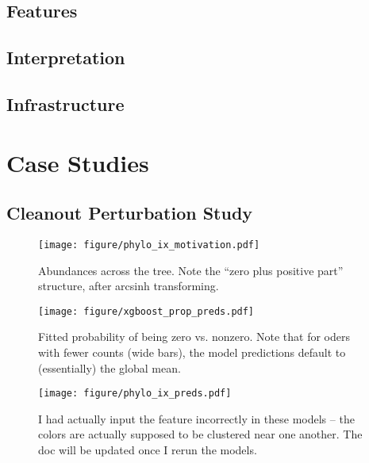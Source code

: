 \documentclass{article}
\begin{document}
\subsection{Features}

\subsection{Interpretation}

\subsection{Infrastructure}

\section{Case Studies}

\subsection{Cleanout Perturbation Study}

\begin{figure}[ht]
  \centering
  \texttt{[image: figure/phylo\_ix\_motivation.pdf]}
  \caption{Abundances across the tree. Note the ``zero plus positive part'' structure, after arcsinh transforming. \label{fig:label} }
\end{figure}


\begin{figure}[ht]
  \centering
  \texttt{[image: figure/xgboost\_prop\_preds.pdf]}
  \caption{Fitted probability of being zero vs. nonzero. Note that for oders with fewer counts (wide bars), the model predictions default to (essentially) the global mean.\label{fig:label} }
\end{figure}

\begin{figure}[ht]
  \centering
  \texttt{[image: figure/phylo\_ix\_preds.pdf]}
  \caption{I had actually input the feature incorrectly in these models -- the colors are actually supposed to be clustered near one another. The doc will be updated once I rerun the models. \label{fig:label} }
\end{figure}



\end{document}
